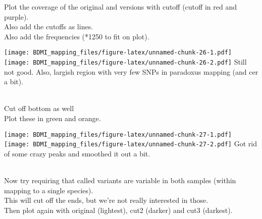 \documentclass[
]{article}
\newenvironment{Shaded}{\begin{snugshade}}{\end{snugshade}}
\newcommand{\DecValTok}[1]{\textcolor[rgb]{0.00,0.00,0.81}{#1}}
\newcommand{\FunctionTok}[1]{\textcolor[rgb]{0.13,0.29,0.53}{\textbf{#1}}}
\newcommand{\NormalTok}[1]{#1}
\newcommand{\OtherTok}[1]{\textcolor[rgb]{0.56,0.35,0.01}{#1}}
\newcommand{\SpecialCharTok}[1]{\textcolor[rgb]{0.81,0.36,0.00}{\textbf{#1}}}
\begin{document}
\begin{Shaded}
\end{Shaded}

Plot the coverage of the original and versions with cutoff (cutoff in
red and purple).\\
Also add the cutoffs as lines.\\
Also add the frequencies (*1250 to fit on plot).

\texttt{[image: BDMI\_mapping\_files/figure-latex/unnamed-chunk-26-1.pdf]}
\texttt{[image: BDMI\_mapping\_files/figure-latex/unnamed-chunk-26-2.pdf]}
Still not good. Also, largish region with very few SNPs in paradoxus
mapping (and cer a bit).\\
\strut \\
Cut off bottom as well\\
Plot these in green and orange.

\texttt{[image: BDMI\_mapping\_files/figure-latex/unnamed-chunk-27-1.pdf]}
\texttt{[image: BDMI\_mapping\_files/figure-latex/unnamed-chunk-27-2.pdf]}
Got rid of some crazy peaks and smoothed it out a bit.\\
\strut \\
Now try requiring that called variants are variable in both samples
(within mapping to a single species).\\
This will cut off the ends, but we're not really interested in those.\\
Then plot again with original (lightest), cut2 (darker) and cut3
(darkest).
\end{document}
